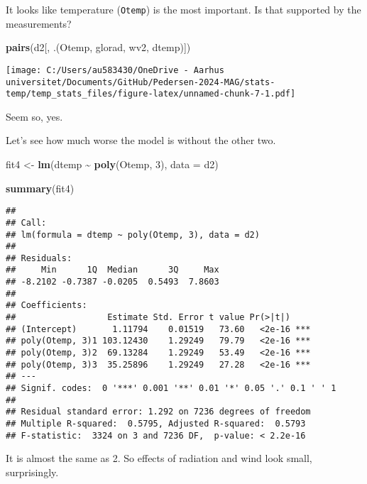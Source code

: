 \documentclass[
]{article}
\newenvironment{Shaded}{\begin{snugshade}}{\end{snugshade}}
\newcommand{\AttributeTok}[1]{\textcolor[rgb]{0.13,0.29,0.53}{#1}}
\newcommand{\DecValTok}[1]{\textcolor[rgb]{0.00,0.00,0.81}{#1}}
\newcommand{\FunctionTok}[1]{\textcolor[rgb]{0.13,0.29,0.53}{\textbf{#1}}}
\newcommand{\NormalTok}[1]{#1}
\newcommand{\OtherTok}[1]{\textcolor[rgb]{0.56,0.35,0.01}{#1}}
\newcommand{\SpecialCharTok}[1]{\textcolor[rgb]{0.81,0.36,0.00}{\textbf{#1}}}
\begin{document}
It looks like temperature (\texttt{Otemp}) is the most important. Is
that supported by the measurements?

\begin{Shaded}
\begin{Highlighting}[]
\FunctionTok{pairs}\NormalTok{(d2[, .(Otemp, glorad, wv2, dtemp)])}
\end{Highlighting}
\end{Shaded}

\texttt{[image: C:/Users/au583430/OneDrive - Aarhus universitet/Documents/GitHub/Pedersen-2024-MAG/stats-temp/temp\_stats\_files/figure-latex/unnamed-chunk-7-1.pdf]}

Seem so, yes.

Let's see how much worse the model is without the other two.

\begin{Shaded}
\begin{Highlighting}[]
\NormalTok{fit4 }\OtherTok{\textless{}{-}} \FunctionTok{lm}\NormalTok{(dtemp }\SpecialCharTok{\textasciitilde{}} \FunctionTok{poly}\NormalTok{(Otemp, }\DecValTok{3}\NormalTok{), }\AttributeTok{data =}\NormalTok{ d2)}
\end{Highlighting}
\end{Shaded}

\begin{Shaded}
\begin{Highlighting}[]
\FunctionTok{summary}\NormalTok{(fit4)}
\end{Highlighting}
\end{Shaded}

\begin{verbatim}
## 
## Call:
## lm(formula = dtemp ~ poly(Otemp, 3), data = d2)
## 
## Residuals:
##     Min      1Q  Median      3Q     Max 
## -8.2102 -0.7387 -0.0205  0.5493  7.8603 
## 
## Coefficients:
##                  Estimate Std. Error t value Pr(>|t|)    
## (Intercept)       1.11794    0.01519   73.60   <2e-16 ***
## poly(Otemp, 3)1 103.12430    1.29249   79.79   <2e-16 ***
## poly(Otemp, 3)2  69.13284    1.29249   53.49   <2e-16 ***
## poly(Otemp, 3)3  35.25896    1.29249   27.28   <2e-16 ***
## ---
## Signif. codes:  0 '***' 0.001 '**' 0.01 '*' 0.05 '.' 0.1 ' ' 1
## 
## Residual standard error: 1.292 on 7236 degrees of freedom
## Multiple R-squared:  0.5795, Adjusted R-squared:  0.5793 
## F-statistic:  3324 on 3 and 7236 DF,  p-value: < 2.2e-16
\end{verbatim}

It is almost the same as 2. So effects of radiation and wind look small,
surprisingly.
\end{document}
